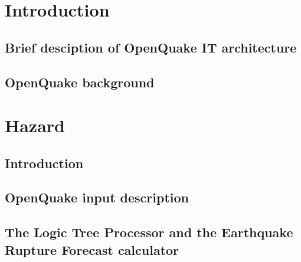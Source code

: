\documentclass[11pt,a4paper,headings=small,version=first,dvips]{scrbook}
\begin{document}
\part{Introduction}
\chapter{Brief desciption of OpenQuake IT architecture}
	
\chapter{OpenQuake background}
	
\part{Hazard}
\chapter{Introduction}
	\label{chap:inthaz}
	
\chapter{OpenQuake input description}
	\label{chap:hazinp}
	
\chapter{The Logic Tree Processor and the Earthquake Rupture Forecast 
	calculator}
	\label{chap:erf}
	
	
\end{document}
